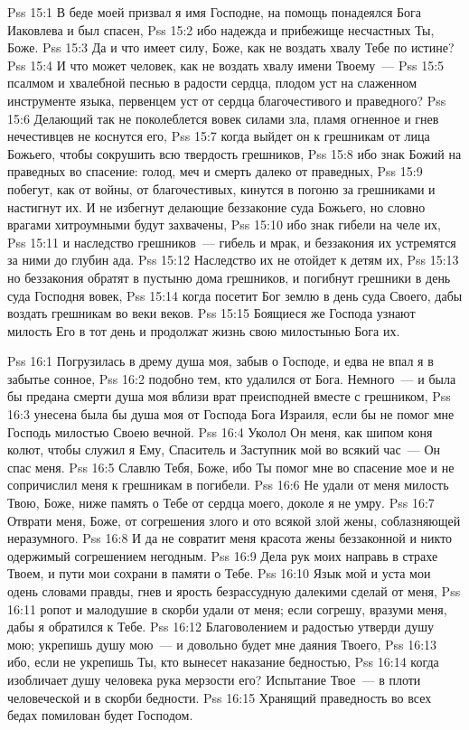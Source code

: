 \vs Pss 15:1
В беде моей призвал я имя Господне,
на помощь понадеялся Бога Иаковлева и был спасен,
\vs Pss 15:2
ибо надежда и прибежище несчастных Ты, Боже.
\vs Pss 15:3
Да и что имеет силу, Боже, как не воздать хвалу Тебе по
истине?
\vs Pss 15:4
И что может человек, как не воздать хвалу имени
Твоему~---
\vs Pss 15:5
псалмом и хвалебной песнью в радости сердца, плодом уст на
слаженном инструменте языка, первенцем уст от сердца благочестивого и
праведного?
\vs Pss 15:6
Делающий так не поколеблется вовек силами зла, пламя огненное и
гнев нечестивцев не коснутся его,
\vs Pss 15:7
когда выйдет он к грешникам от лица Божьего, чтобы сокрушить
всю твердость грешников,
\vs Pss 15:8
ибо знак Божий на праведных во спасение: голод, меч и смерть
далеко от праведных,
\vs Pss 15:9
побегут, как от войны, от благочестивых, кинутся в погоню за
грешниками и настигнут их. И не избегнут делающие беззаконие суда Божьего, но
словно врагами хитроумными будут захвачены,
\vs Pss 15:10
ибо знак гибели на челе их,
\vs Pss 15:11
и наследство грешников~--- гибель и мрак, и беззакония их
устремятся за ними до глубин ада.
\vs Pss 15:12
Наследство их не отойдет к детям их,
\vs Pss 15:13
но беззакония обратят в пустыню дома грешников, и погибнут грешники
в день суда Господня вовек,
\vs Pss 15:14
когда посетит Бог землю в день суда Своего, дабы воздать грешникам
во веки веков.
\vs Pss 15:15
Боящиеся же Господа узнают милость Его в тот день и продолжат жизнь
свою милостынью Бога их.

\vs Pss 16:1
Погрузилась в дрему душа моя, забыв о Господе, и едва не впал я
в забытье сонное,
\vs Pss 16:2
подобно тем, кто удалился от Бога.
Немного~--- и была бы предана смерти душа моя вблизи врат преисподней вместе
с грешником,
\vs Pss 16:3
унесена была бы душа моя от Господа Бога Израиля, если бы не
помог мне Господь милостью Своею вечной.
\vs Pss 16:4
Уколол Он меня, как шипом коня колют, чтобы служил я Ему,
Спаситель и Заступник мой во всякий час~--- Он спас меня.
\vs Pss 16:5
Славлю Тебя, Боже, ибо Ты помог мне во спасение мое и не
сопричислил меня к грешникам в погибели.
\vs Pss 16:6
Не удали от меня милость Твою, Боже, ниже память о Тебе от
сердца моего, доколе я не умру.
\vs Pss 16:7
Отврати меня, Боже, от согрешения злого и ото всякой злой жены,
соблазняющей неразумного.
\vs Pss 16:8
И да не совратит меня красота жены беззаконной и никто
одержимый согрешением негодным.
\vs Pss 16:9
Дела рук моих направь в страхе Твоем, и пути мои сохрани в
памяти о Тебе.
\vs Pss 16:10
Язык мой и уста мои одень словами правды, гнев и ярость безрассудную
далекими сделай от меня,
\vs Pss 16:11
ропот и малодушие в скорби удали от меня; если согрешу, вразуми
меня, дабы я обратился к Тебе.
\vs Pss 16:12
Благоволением и радостью утверди душу мою; укрепишь душу мою~--- и
довольно будет мне даяния Твоего,
\vs Pss 16:13
ибо, если не укрепишь Ты, кто вынесет наказание бедностью,
\vs Pss 16:14
когда изобличает душу человека рука мерзости его? Испытание
Твое~--- в плоти человеческой и в скорби бедности.
\vs Pss 16:15
Хранящий праведность во всех бедах помилован будет Господом.

